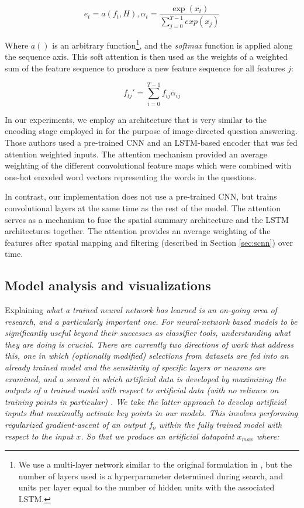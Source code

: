 \documentclass[utf8]{frontiersSCNS} %
\begin{document}
\begin{equation} \label{eq:attn_nrg}
  e_{t} = a(f_{t}, H) , \alpha_t =  \frac{\exp(x_{t})}{\sum_{j=0}^{T-1}exp(x_{j})}
\end{equation}

Where $a()$ is an arbitrary function\footnote{We use a multi-layer network similar to the original formulation in \cite{XuKELVINXU}, but the number of layers used is a hyperparameter determined during search, and units per layer equal to the number of hidden units with the associated LSTM.}, and the \emph{softmax} function is applied along the sequence axis. This soft attention is then used as the weights of a weighted sum of the feature sequence to produce a new feature sequence for all features $j$: 

\begin{equation} \label{eq:attn}
    f_{tj}' = \sum_{i=0}^{T-1} f_{ij} \alpha_{ij}
  \end{equation}

In our experiments, we employ an architecture that is very similar to the encoding stage employed in \cite{Zhu} for the purpose of image-directed question answering. Those authors used a pre-trained CNN and an LSTM-based encoder that was fed attention weighted inputs. The attention mechanism provided an average weighting of the different convolutional feature maps which were combined with one-hot encoded word vectors representing the words in the questions.


In contrast, our implementation does not use a pre-trained CNN, but trains convolutional layers at the same time as the rest of the model. The attention serves as a mechanism to fuse the spatial summary architecture and the LSTM architectures together. The attention provides an average weighting of the features after spatial mapping and filtering (described in Section \ref{sec:scnn}) over time.

\subsection{Model analysis and visualizations}

Explaining \em{what} a trained neural network has learned is an on-going area of research, and a particularly important one. For neural-network based models to be significantly useful beyond their successes as classifier tools, understanding what they are doing is crucial. There are currently two directions of work that address this, one in which (optionally modified) selections from datasets are fed into an already trained model and the sensitivity of specific layers or neurons are examined, and a second in which artificial data is developed by maximizing the outputs of a trained model with respect to artificial data (with no reliance on training points in particular) \cite{Yosinski2015}. We take the latter approach to develop artificial inputs that \em{maximally activate} key points in our models. This involves performing regularized gradient-ascent of an output $f_o$ within the fully trained model with respect to the input $x$. So that we produce an artificial datapoint $x_{max}$ where:
\end{document}
